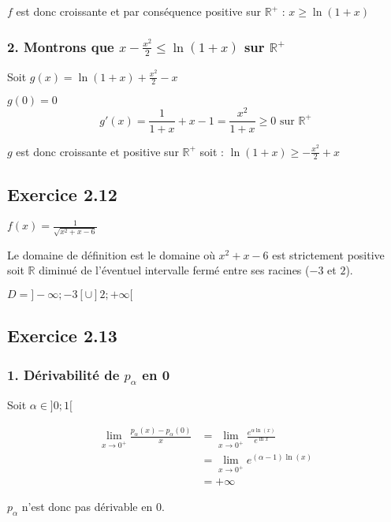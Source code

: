 \documentclass[a4paper,10pt]{report}
\begin{document}
$f$ est donc croissante et par conséquence positive sur $\mathbb{R}^{+}$ : $x \geq \ln(1+x)$


\subsubsection*{2. Montrons que $x -\frac{x^2}{2} \leq \ln(1+x)$ sur $\mathbb{R}^+$}

Soit $g(x) = \ln(1+x) + \frac{x^2}{2} - x$

$g(0) = 0$
\begin{displaymath}
	g'(x) = \frac{1}{1+x} + x - 1 = \frac{x^2}{1+x} \geq 0 \text{ sur } \mathbb{R}^{+}
\end{displaymath}

$g$ est donc croissante et positive sur $\mathbb{R}^{+}$ soit : $\ln(1+x) \geq -\frac{x^2}{2} + x$

\subsection*{Exercice 2.12}

$f(x) = \frac{1}{\sqrt{x^2 +x - 6}}$

Le domaine de définition est le domaine où $x^2 + x -6$ est strictement positive soit $\mathbb{R}$ diminué de l'éventuel
intervalle fermé entre ses racines ($-3$ et $2$).

$D = ]-\infty ; -3 [ \cup ]2; +\infty[$

\subsection*{Exercice 2.13}
\subsubsection*{1. Dérivabilité de $p_\alpha$ en 0}

Soit $\alpha \in ]0;1[$

\begin{equation*}
	\begin{split}
		\lim_{x \rightarrow 0^{+}} \frac{p_{\alpha}(x) - p_{\alpha}(0)}{x}
		&= \lim_{x \rightarrow 0^{+}} \frac{e^{\alpha \ln(x)}}{e^{\ln x}} \\
		&= \lim_{x \rightarrow 0^{+}} e^{(\alpha-1) \ln(x)} \\
		&= +\infty
	\end{split}
\end{equation*}

$p_\alpha$ n'est donc pas dérivable en $0$.
\end{document}
